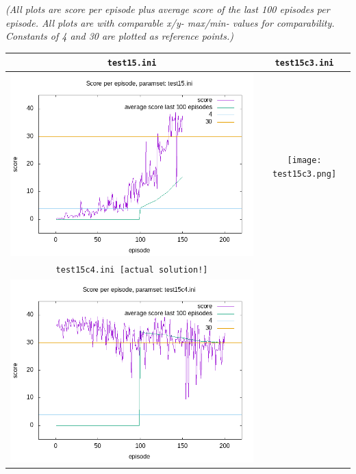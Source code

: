 \documentclass[a4paper]{article}
\begin{document}
\textit{(All plots are score per episode plus average score of the last 100 episodes per episode.
All plots are with comparable x/y- max/min- values for comparability. Constants of 4 and 30 are plotted as reference points.)}
\\
\begin{tabular}{ |c|c| }
  \hline
  \texttt{test15.ini} & \texttt{test15c3.ini} \\
  \hline
  \includegraphics[scale=0.35]{test15.png} & \texttt{[image: test15c3.png]} \\
  \hline
  \texttt{test15c4.ini [actual solution!]} & \\
  \hline
  \includegraphics[scale=0.35]{test15c4.png} &  \\
  \hline
\end{tabular}
\end{document}
